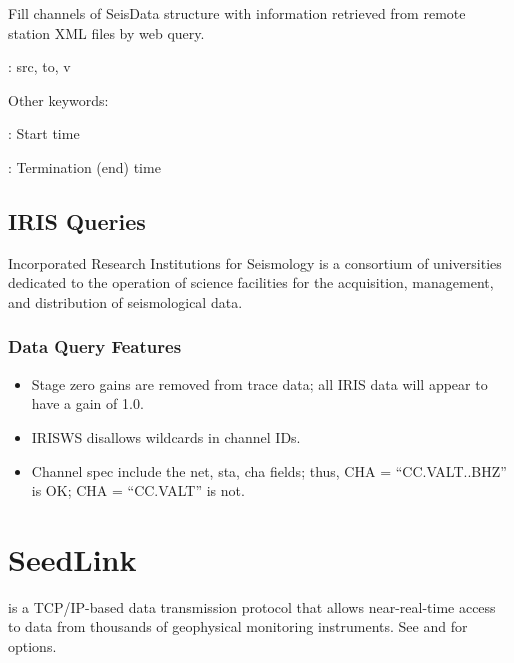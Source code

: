 \documentclass[letterpaper,11pt,english]{sphinxmanual}
\begin{document}
Fill channels  of SeisData structure  with information retrieved from
remote station XML files by web query.

\begin{DUlineblock}{0em}
\item[] {\hyperref[\detokenize{src/Appendices/keywords:dkw}]{}}: src, to, v
\item[] Other keywords:
\item[] : Start time
\item[] : Termination (end) time
\end{DUlineblock}


\subsection{IRIS Queries}
\label{\detokenize{src/Web/webclients:iris-queries}}\label{\detokenize{src/Web/webclients:irisws}}
Incorporated Research Institutions for Seismology  is a consortium of universities dedicated to the operation of science facilities for the acquisition, management, and distribution of seismological data.


\subsubsection{Data Query Features}
\label{\detokenize{src/Web/webclients:data-query-features}}\begin{itemize}
\item {} 
Stage zero gains are removed from trace data; all IRIS data will appear to have a gain of 1.0.

\item {} 
IRISWS disallows wildcards in channel IDs.

\item {} 
Channel spec  include the net, sta, cha fields; thus, CHA = “CC.VALT..BHZ” is OK; CHA = “CC.VALT” is not.

\end{itemize}


\section{SeedLink}
\label{\detokenize{src/Web/seedlink:seedlink}}\label{\detokenize{src/Web/seedlink:seedlink-section}}\label{\detokenize{src/Web/seedlink::doc}}
 is a
TCP/IP-based data transmission protocol that allows near-real-time access to
data from thousands of geophysical monitoring instruments. See
{\hyperref[\detokenize{src/Appendices/keywords:dkw}]{}} and {\hyperref[\detokenize{src/Appendices/web_syntax:cid}]{}} for options.
\end{document}
